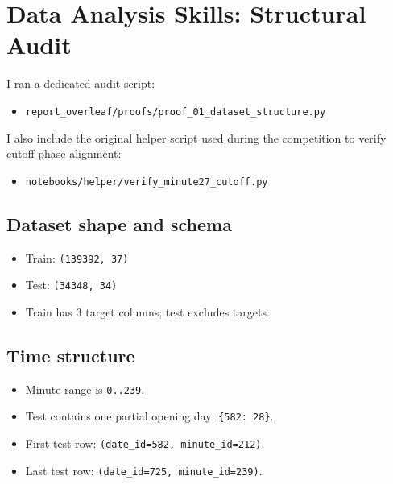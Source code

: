 \section{Data Analysis Skills: Structural Audit}

I ran a dedicated audit script:
\begin{itemize}[leftmargin=1.5em]
  \item \texttt{report\_overleaf/proofs/proof\_01\_dataset\_structure.py}
\end{itemize}
I also include the original helper script used during the competition to verify cutoff-phase alignment:
\begin{itemize}[leftmargin=1.5em]
  \item \texttt{notebooks/helper/verify\_minute27\_cutoff.py}
\end{itemize}

\subsection{Dataset shape and schema}
\begin{itemize}[leftmargin=1.5em]
  \item Train: \texttt{(139392, 37)}
  \item Test: \texttt{(34348, 34)}
  \item Train has 3 target columns; test excludes targets.
\end{itemize}

\subsection{Time structure}
\begin{itemize}[leftmargin=1.5em]
  \item Minute range is \texttt{0..239}.
  \item Test contains one partial opening day: \texttt{\{582: 28\}}.
  \item First test row: \texttt{(date\_id=582, minute\_id=212)}.
  \item Last test row: \texttt{(date\_id=725, minute\_id=239)}.
\end{itemize}


